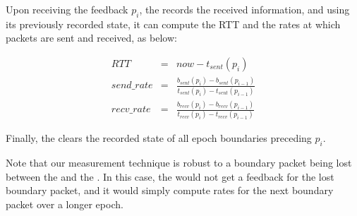 Upon receiving the feedback $p_i$, the \inbox records the received information, and using its previously recorded state, it can compute the RTT and the rates at which packets are sent and received, as below:

\vspace{-10pt}
\begin{subequations}
    \begin{align}
        RTT &= &now -  t_{sent}(p_i)\\
        send\_rate &= &\frac{b_{sent}(p_i) - b_{sent}(p_{i-1})}{t_{sent}(p_i)-t_{sent}(p_{i-1})}\\
        recv\_rate &= &\frac{b_{recv}(p_i) - b_{recv}(p_{i-1})}{t_{recv}(p_i)-t_{recv}(p_{i-1})}
    \end{align}
\end{subequations}

Finally, the \inbox clears the recorded state of all epoch boundaries preceding $p_i$.

Note that our measurement technique is robust to a boundary packet being lost between the \inbox and the \outbox. In this case, the \inbox would not get a feedback for the lost boundary packet, and it would simply compute rates for the next boundary packet over a longer epoch. 

